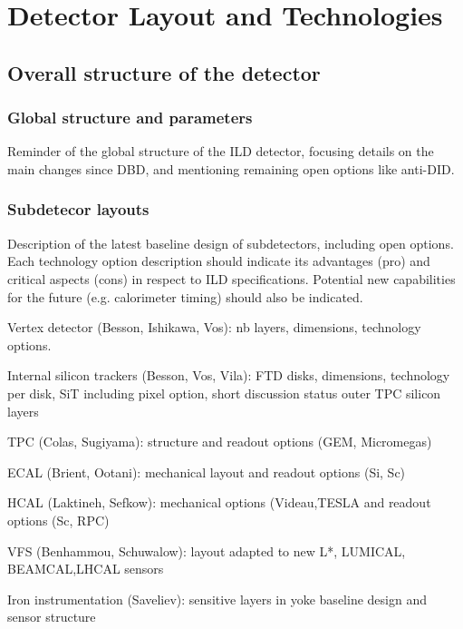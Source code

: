 \chapter{Detector Layout and Technologies}

\section{Overall structure of the detector}
\vspace{4cm}
\subsection{Global structure and parameters}

Reminder of the global structure of the ILD detector, focusing details on the main changes since DBD, and mentioning remaining open options like anti-DID.

\vspace{2cm}
\subsection{Subdetecor layouts}

Description of the latest baseline design of subdetectors, including open options. Each technology option description should indicate its advantages (pro) and critical aspects (cons) in respect to ILD specifications. Potential new capabilities for the future (e.g. calorimeter timing) should also be indicated.

Vertex detector (Besson, Ishikawa, Vos): nb layers, dimensions, technology options.

Internal silicon trackers (Besson, Vos, Vila): FTD disks, dimensions, technology per disk, SiT including pixel option, short discussion status
outer TPC  silicon layers

TPC (Colas, Sugiyama): structure and readout options (GEM, Micromegas)

ECAL (Brient, Ootani): mechanical layout and readout options (Si, Sc)

HCAL (Laktineh, Sefkow): mechanical options (Videau,TESLA and readout options (Sc, RPC)

VFS (Benhammou, Schuwalow): layout adapted to new L*, LUMICAL, BEAMCAL,LHCAL sensors

Iron instrumentation (Saveliev): sensitive layers in yoke baseline design and sensor structure

